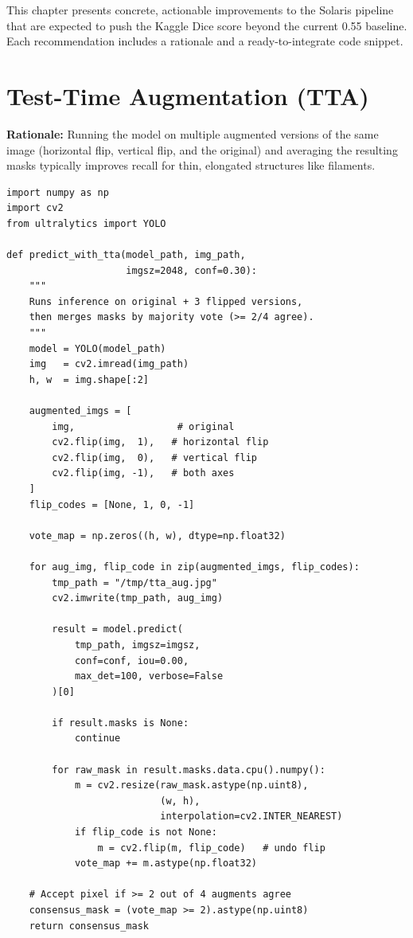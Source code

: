 \documentclass[11pt,a4paper,openany]{report}
\begin{document}
This chapter presents concrete, actionable improvements to the Solaris pipeline that are
expected to push the Kaggle Dice score beyond the current 0.55 baseline. Each recommendation
includes a rationale and a ready-to-integrate code snippet.

\section{Test-Time Augmentation (TTA)}

\textbf{Rationale:} Running the model on multiple augmented versions of the same image (horizontal
flip, vertical flip, and the original) and averaging the resulting masks typically improves recall
for thin, elongated structures like filaments.

\begin{lstlisting}[caption={TTA inference wrapper},label={lst:tta}]
import numpy as np
import cv2
from ultralytics import YOLO

def predict_with_tta(model_path, img_path,
                     imgsz=2048, conf=0.30):
    """
    Runs inference on original + 3 flipped versions,
    then merges masks by majority vote (>= 2/4 agree).
    """
    model = YOLO(model_path)
    img   = cv2.imread(img_path)
    h, w  = img.shape[:2]

    augmented_imgs = [
        img,                  # original
        cv2.flip(img,  1),   # horizontal flip
        cv2.flip(img,  0),   # vertical flip
        cv2.flip(img, -1),   # both axes
    ]
    flip_codes = [None, 1, 0, -1]

    vote_map = np.zeros((h, w), dtype=np.float32)

    for aug_img, flip_code in zip(augmented_imgs, flip_codes):
        tmp_path = "/tmp/tta_aug.jpg"
        cv2.imwrite(tmp_path, aug_img)

        result = model.predict(
            tmp_path, imgsz=imgsz,
            conf=conf, iou=0.00,
            max_det=100, verbose=False
        )[0]

        if result.masks is None:
            continue

        for raw_mask in result.masks.data.cpu().numpy():
            m = cv2.resize(raw_mask.astype(np.uint8),
                           (w, h),
                           interpolation=cv2.INTER_NEAREST)
            if flip_code is not None:
                m = cv2.flip(m, flip_code)   # undo flip
            vote_map += m.astype(np.float32)

    # Accept pixel if >= 2 out of 4 augments agree
    consensus_mask = (vote_map >= 2).astype(np.uint8)
    return consensus_mask
\end{lstlisting}
\end{document}
